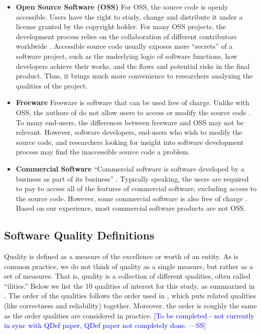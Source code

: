 \documentclass[final, 3p, times, authoryear]{elsarticle}
\newcommand{\authornote}[3]{\textcolor{#1}{[#3 ---#2]}}
\newcommand{\authornote}[3]{}
\newcommand{\wss}[1]{\authornote{blue}{SS}{#1}} %
\begin{document}
\begin{itemize}

\item \textbf{Open Source Software (OSS)} For OSS, the source code is openly
accessible. Users have the right to study, change and distribute it under a
license granted by the copyright holder. For many OSS projects, the development
process relies on the collaboration of different contributors worldwide
\citep{Corbly2014}. Accessible source code usually exposes more ``secrets'' of a
software project, such as the underlying logic of software functions, how
developers achieve their works, and the flaws and potential risks in the final
product. Thus, it brings much more convenience to researchers analyzing the
qualities of the project.

\item \textbf{Freeware} Freeware is software that can be used free of charge.
Unlike with OSS, the authors of do not allow users to access or modify the
source code \citep{LINFO2006}. To many end-users, the differences between
freeware and OSS may not be relevant. However, software developers, end-users
who wish to modify the source code, and researchers looking for insight into
software development process may find the inaccessible source code a problem. 

\item \textbf{Commercial Software} ``Commercial software is software developed
by a business as part of its business'' \citep{GNU2019}. Typically speaking, the
users are required to pay to access all of the features of commercial software,
excluding access to the source code. However, some commercial software is also
free of charge \citep{GNU2019}. Based on our experience, most commercial
software products are not OSS.

\end{itemize}

\subsection{Software Quality Definitions} \label{sec_software_quality}

Quality is defined as a measure of the excellence or worth of an entity.  As is
common practice, we do not think of quality as a single measure, but rather as a
set of measures.  That is, quality is a collection of different qualities, often
called ``ilities.''  Below we list the 10 qualities of interest for this study,
as summarized in \citet{SmithEtAl2021-QDef}.  The order of the qualities follows
the order used in \cite{GhezziEtAl2003}, which puts related qualities (like
correctness and reliability) together.  Moreover, the order is roughly the same
as the order qualities are considered in practice.  \wss{To be completed - not
currently in sync with QDef paper, QDef paper not completely done.}
\end{document}
